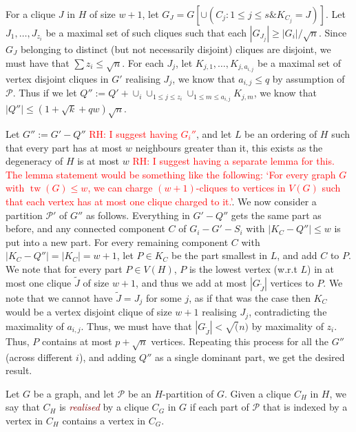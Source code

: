 \documentclass[12pt]{article}
\newcommand{\defn}[1]{\textcolor{Maroon}{\emph{#1}}}
\renewcommand{\geq}{\geqslant}
\renewcommand{\leq}{\leqslant}
\DeclareMathOperator{\tw}{tw}
\newcommand{\PP}{\mathcal{P}}
\newcommand{\scr}[1]{\mathcal{#1}}
\newcommand{\robert}[1]{\textcolor{red}{RH: #1}}
\theoremstyle{plain}
\theoremstyle{definition}
\begin{document}
    For a clique $J$ in $H$ of size $w+1$, let $G_J=G[\cup(C_j:1\leq j\leq s \& K_{C_j}=J)]$. Let $J_1,\dots,J_{z_i}$ be a maximal set of such cliques such that each $|G_{J_j}|\geq |G_i|/\sqrt{n}$. Since $G_J$ belonging to distinct (but not necessarily disjoint) cliques are disjoint, we must have that $\sum z_i \leq \sqrt{n}$. For each $J_j$, let $K_{j,1},\dots,K_{j,a_{i,j}}$ be a maximal set of vertex disjoint cliques in $G'$ realising $J_j$, we know that $a_{i,j}\leq q$ by assumption of $\scr{P}$. Thus if we let $Q'':=Q'+\cup_i\cup_{1\leq j\leq z_i}\cup_{1\leq m\leq a_{i,j}}K_{j,m}$, we know that $|Q''|\leq (1+\sqrt{k}+qw)\sqrt{n}$.
    
    Let $G'':=G'-Q''$ \robert{I suggest having $G_i''$}, and let $L$ be an ordering of $H$ such that every part has at most $w$ neighbours greater than it, this exists as the degeneracy of $H$ is at most $w$ \robert{I suggest having a separate lemma for this. The lemma statement would be something like the following: `For every graph $G$ with $\tw(G)\leq w$, we can charge $(w+1)$-cliques to vertices in $V(G)$ such that each vertex has at most one clique charged to it.'}. We now consider a partition $\scr{P}'$ of $G''$ as follows. Everything in $G'-Q''$ gets the same part as before, and any connected component $C$ of $G_i-G'-S_i$ with $|K_C-Q''|\leq w$ is put into a new part. For every remaining component $C$ with $|K_C-Q''|=|K_C|= w+1$, let $P\in K_C$ be the part smallest in $L$, and add $C$ to $P$. We note that for every part $P\in V(H)$, $P$ is the lowest vertex (w.r.t $L$) in at most one clique $\tilde{J}$ of size $w+1$, and thus we add at most $|G_{\tilde{J}}|$ vertices to $P$. We note that we cannot have $\tilde{J}=J_j$ for some $j$, as if that was the case then $K_C$ would be a vertex disjoint clique of size $w+1$ realising $J_j$, contradicting the maximality of $a_{i,j}$. Thus, we must have that $|G_{\tilde{J}}|<\sqrt(n)$ by maximality of $z_i$. Thus, $P$ contains at most $p+\sqrt{n}$ vertices. Repeating this process for all the $G''$ (across different $i$), and adding $Q''$ as a single dominant part, we get the desired result.


Let $G$ be a graph, and let $\scr{P}$ be an $H$-partition of $G$. Given a clique $C_H$ in $H$, we say that $C_H$ is \defn{realised} by a clique $C_G$ in $G$ if each part of $\PP$ that is indexed by a vertex in $C_H$ contains a vertex in $C_G$.
\end{document}
